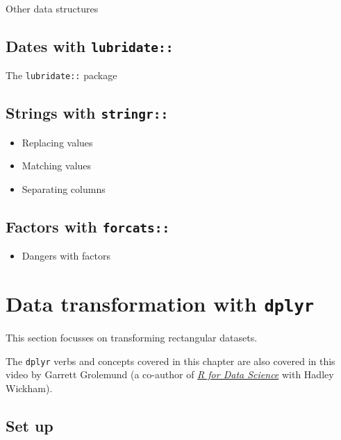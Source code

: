 \documentclass[]{book}
\providecommand{\tightlist}{%
  \setlength{\itemsep}{0pt}\setlength{\parskip}{0pt}}
\begin{document}
Other data structures

\hypertarget{dates-with-lubridate}{%
\section{\texorpdfstring{Dates with \texttt{lubridate::}}{Dates with lubridate::}}\label{dates-with-lubridate}}

The \texttt{lubridate::} package

\hypertarget{strings-with-stringr}{%
\section{\texorpdfstring{Strings with \texttt{stringr::}}{Strings with stringr::}}\label{strings-with-stringr}}

\begin{itemize}
\tightlist
\item
  Replacing values
\item
  Matching values
\item
  Separating columns
\end{itemize}

\hypertarget{factors-with-forcats}{%
\section{\texorpdfstring{Factors with \texttt{forcats::}}{Factors with forcats::}}\label{factors-with-forcats}}

\begin{itemize}
\tightlist
\item
  Dangers with factors
\end{itemize}

\hypertarget{data-transformation-with-dplyr}{%
\chapter{\texorpdfstring{Data transformation with \texttt{dplyr}}{Data transformation with dplyr}}\label{data-transformation-with-dplyr}}

This section focusses on transforming rectangular datasets.

The \texttt{dplyr} verbs and concepts covered in this chapter are also covered in this video by Garrett Grolemund (a co-author of \emph{\href{https://r4ds.had.co.nz/}{R for Data Science}} with Hadley Wickham).

\hypertarget{set-up}{%
\section{Set up}\label{set-up}}
\end{document}
